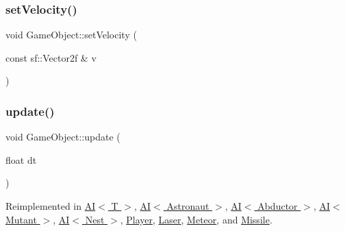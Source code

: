 \subsubsection{\texorpdfstring{set\+Velocity()}{setVelocity()}}
{\footnotesize\ttfamily void Game\+Object\+::set\+Velocity (\begin{DoxyParamCaption}\item[{const sf\+::\+Vector2f \&}]{v }\end{DoxyParamCaption})}

\mbox{\label{class_game_object_a2fece397b6343682d639f8943f124d0e}} 
\subsubsection{\texorpdfstring{update()}{update()}}
{\footnotesize\ttfamily void Game\+Object\+::update (\begin{DoxyParamCaption}\item[{float}]{dt }\end{DoxyParamCaption})\hspace{0.3cm}{\ttfamily [virtual]}}



Reimplemented in \hyperlink{class_a_i_a1e1875bffd6f4da9e8333cba89aa3cd7}{A\+I$<$ T $>$}, \hyperlink{class_a_i_a1e1875bffd6f4da9e8333cba89aa3cd7}{A\+I$<$ Astronaut $>$}, \hyperlink{class_a_i_a1e1875bffd6f4da9e8333cba89aa3cd7}{A\+I$<$ Abductor $>$}, \hyperlink{class_a_i_a1e1875bffd6f4da9e8333cba89aa3cd7}{A\+I$<$ Mutant $>$}, \hyperlink{class_a_i_a1e1875bffd6f4da9e8333cba89aa3cd7}{A\+I$<$ Nest $>$}, \hyperlink{class_player_abe2902b7decc38472183a08977eeb57f}{Player}, \hyperlink{class_laser_af692c14903cce59991bdd9cc9f78aeb3}{Laser}, \hyperlink{class_meteor_a141f6128d03a106bad61db3778404be7}{Meteor}, and \hyperlink{class_missile_a5750280ac2f18df9cf3f5f87341be655}{Missile}.

